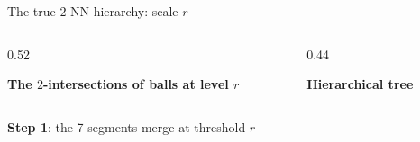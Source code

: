 \documentclass[A4,svgnames,9pt,aspectratio=169]{beamer}
\begin{document}
\begin{frame}{The true $2$-NN hierarchy: scale $r$}
    \begin{columns}[c, onlytextwidth]
        \begin{column}{0.52\textwidth}
            \begin{center}
                \textbf{The $2$-intersections of balls at level $r$}

                \vspace{0.4cm}
                
            \end{center}
        \end{column}

        \begin{column}{0.44\textwidth}
            \begin{center}
                \textcolor{inria-rouge}{\textbf{Hierarchical tree}}

                \vspace{0.4cm}
                
            \end{center}
        \end{column}
    \end{columns}
    \vspace{0.3cm}
    \begin{center}
        \small \textbf{Step 1}: the 7 segments merge at threshold $r$
    \end{center}
\end{frame}
\end{document}
